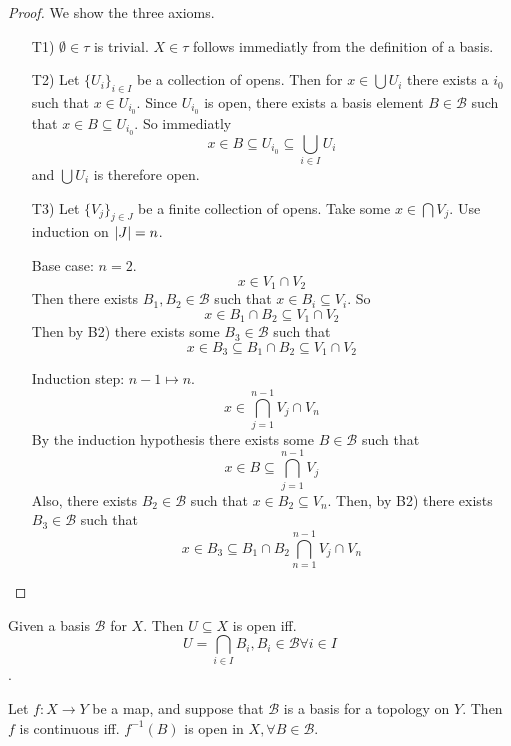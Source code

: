 \begin{proof}
  We show the three axioms.
  \begin{enumerate}
    \item[T1)] \( \emptyset \in \tau \) is trivial. \( X \in \tau \) follows immediatly from the definition of a basis.
    \item[T2)] Let \( \{  U_i  \}_{i \in I}  \) be a collection of opens.
      Then for \( x \in \bigcup U_i \) there exists a \( i_0 \) such that
      \( x \in U_{i_0} \). Since \( U_{i_0} \) is open, there exists
      a basis element \( B \in \mathscr{B} \) such that
      \( x \in B \subseteq U_{i_0} \). So immediatly
      \[
        x \in B \subseteq U_{i_0} \subseteq \bigcup_{i \in I} U_i
      \]
      and  \( \bigcup U_i \) is therefore open.
    \item[T3)]
      Let \( \{ V_j  \}_{j \in J}  \) be a finite collection of opens.
      Take some \( x \in \bigcap V_j \). Use induction on \( \left\lvert{J}\right\rvert = n \).

      Base case: \( n = 2 \).
      \[
        x \in V_1 \cap V_2
      \]
      Then there exists \( B_1, B_2 \in \mathscr{B} \) such that
      \( x \in B_i \subseteq V_i \). So 
      \[
        x \in B_1 \cap B_2 \subseteq V_1 \cap V_2
      \]
      Then by B2) there exists some \( B_3 \in \mathscr{B} \)
      such that
      \[
        x \in B_3 \subseteq B_1 \cap B_2 \subseteq V_1 \cap V_2
      \]

      Induction step: \( n-1 \mapsto n \).
      \[
        x \in \bigcap_{j=1}^{n-1} V_j \cap V_n
      \]
      By the induction hypothesis there exists
      some \( B \in \mathscr{B} \) such that
      \[ x \in B \subseteq \bigcap_{j=1}^{n-1} V_j \]
      Also, there exists \( B_2 \in \mathscr{B} \) such that
      \( x \in B_2 \subseteq V_n \). Then, by B2) there exists
      \( B_3 \in \mathscr{B} \) such that
      \[
        x \in B_3 \subseteq B_1 \cap B_2 \bigcap_{n=1}^{n-1} V_j \cap V_n
      \]
  \end{enumerate}
\end{proof}

\begin{example}
  Given a basis \( \mathscr{B} \) for \( X \).
  Then \( U \subseteq X \) is open iff.
  \[ U = \bigcap_{i\in I} B_i, B_i \in \mathscr{B} \forall i \in I \].
\end{example}

\begin{proposition}
  Let \( f: X \to  Y \) be a map, and suppose
  that \( \mathscr{B} \) is a basis for a topology
  on \( Y \). Then \( f \) is continuous iff.
  \( {f}^{-1}(B) \) is open in \( X, \forall B \in \mathscr{B}  \).
\end{proposition}

